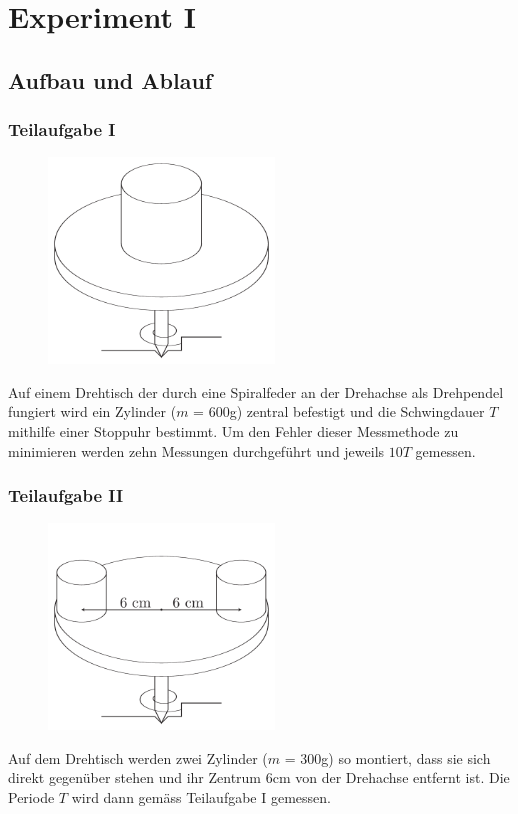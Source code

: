 \documentclass[12pt,a4paper]{article}
\begin{document}
\section*{Experiment I}

\subsection*{Aufbau und Ablauf}
\subsubsection*{Teilaufgabe I}
\begin{figure}
\vspace{-50pt}
\centering
\includegraphics[width=6cm]{illustration11.pdf}
\end{figure}
Auf einem Drehtisch der durch eine Spiralfeder an der Drehachse als Drehpendel fungiert wird ein Zylinder ($m$ = 600g) zentral befestigt und die Schwingdauer $T$ mithilfe einer Stopp\-uhr bestimmt. Um den Fehler dieser Messmethode zu minimieren werden zehn Messungen durchgef\"uhrt und jeweils $10T$ gemessen.

\subsubsection*{Teilaufgabe II}
\begin{figure}
\vspace{-50pt}
\centering
\includegraphics[width=6cm]{illustration12.pdf}
\end{figure}
Auf dem Drehtisch werden zwei Zylinder ($m$ = 300g) so montiert, dass sie sich direkt gegen\"uber stehen und ihr Zentrum 6cm von der Drehachse entfernt ist. Die Periode $T$ wird dann gem\"ass Teilaufgabe I gemessen.
\end{document}
